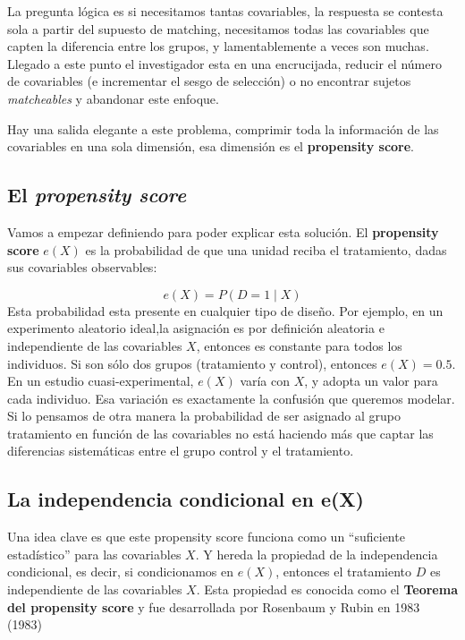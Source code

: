 \documentclass[
  letterpaper,
  DIV=11,
  numbers=noendperiod,
  oneside]{scrreprt}
\begin{document}
La pregunta lógica es si necesitamos tantas covariables, la respuesta se
contesta sola a partir del supuesto de matching, necesitamos todas las
covariables que capten la diferencia entre los grupos, y lamentablemente
a veces son muchas. Llegado a este punto el investigador esta en una
encrucijada, reducir el número de covariables (e incrementar el sesgo de
selección) o no encontrar sujetos \emph{matcheables} y abandonar este
enfoque.

Hay una salida elegante a este problema, comprimir toda la información
de las covariables en una sola dimensión, esa dimensión es el
\textbf{propensity score}.

\hypertarget{el-propensity-score}{%
\subsection{\texorpdfstring{El \emph{propensity
score}}{El propensity score}}\label{el-propensity-score}}

Vamos a empezar definiendo para poder explicar esta solución. El
\textbf{propensity score} \(e(X)\) es la probabilidad de que una unidad
reciba el tratamiento, dadas sus covariables observables:

\[e(X) = P(D = 1 \mid X)\] Esta probabilidad esta presente en cualquier
tipo de diseño. Por ejemplo, en un experimento aleatorio ideal,la
asignación es por definición aleatoria e independiente de las
covariables \(X\), entonces es constante para todos los individuos. Si
son sólo dos grupos (tratamiento y control), entonces \(e(X)=0.5\).\\
En un estudio cuasi-experimental, \(e(X)\) varía con \(X\), y adopta un
valor para cada individuo. Esa variación es exactamente la confusión que
queremos modelar. Si lo pensamos de otra manera la probabilidad de ser
asignado al grupo tratamiento en función de las covariables no está
haciendo más que captar las diferencias sistemáticas entre el grupo
control y el tratamiento.

\hypertarget{la-independencia-condicional-en-ex}{%
\subsection{La independencia condicional en
e(X)}\label{la-independencia-condicional-en-ex}}

Una idea clave es que este propensity score funciona como un
``suficiente estadístico'' para las covariables \(X\). Y hereda la
propiedad de la independencia condicional, es decir, si condicionamos en
\(e(X)\), entonces el tratamiento \(D\) es independiente de las
covariables \(X\). Esta propiedad es conocida como el \textbf{Teorema
del propensity score} y fue desarrollada por Rosenbaum y Rubin en 1983
(1983)
\end{document}
